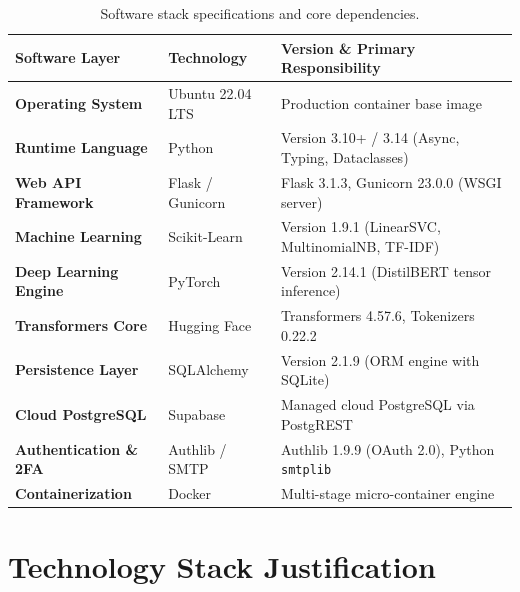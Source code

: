 \begin{table}[htbp]
\centering
\small
\caption{Software stack specifications and core dependencies.}
\label{tab:software_requirements}
\begin{tabularx}{\textwidth}{P{3.5cm} P{2.5cm} L}
\toprule
\textbf{Software Layer} & \textbf{Technology} & \textbf{Version \& Primary Responsibility} \\
\midrule
\textbf{Operating System} & Ubuntu 22.04 LTS & Production container base image \\
\addlinespace
\textbf{Runtime Language} & Python & Version 3.10+ / 3.14 (Async, Typing, Dataclasses) \\
\addlinespace
\textbf{Web API Framework} & Flask / Gunicorn & Flask 3.1.3, Gunicorn 23.0.0 (WSGI server) \\
\addlinespace
\textbf{Machine Learning} & Scikit-Learn & Version 1.9.1 (LinearSVC, MultinomialNB, TF-IDF) \\
\addlinespace
\textbf{Deep Learning Engine} & PyTorch & Version 2.14.1 (DistilBERT tensor inference) \\
\addlinespace
\textbf{Transformers Core} & Hugging Face & Transformers 4.57.6, Tokenizers 0.22.2 \\
\addlinespace
\textbf{Persistence Layer} & SQLAlchemy & Version 2.1.9 (ORM engine with SQLite) \\
\addlinespace
\textbf{Cloud PostgreSQL} & Supabase & Managed cloud PostgreSQL via PostgREST \\
\addlinespace
\textbf{Authentication \& 2FA} & Authlib / SMTP & Authlib 1.9.9 (OAuth 2.0), Python \texttt{smtplib} \\
\addlinespace
\textbf{Containerization} & Docker & Multi-stage micro-container engine \\
\bottomrule
\end{tabularx}
\end{table}

\section{Technology Stack Justification}
\label{sec:tech_stack_justification}

